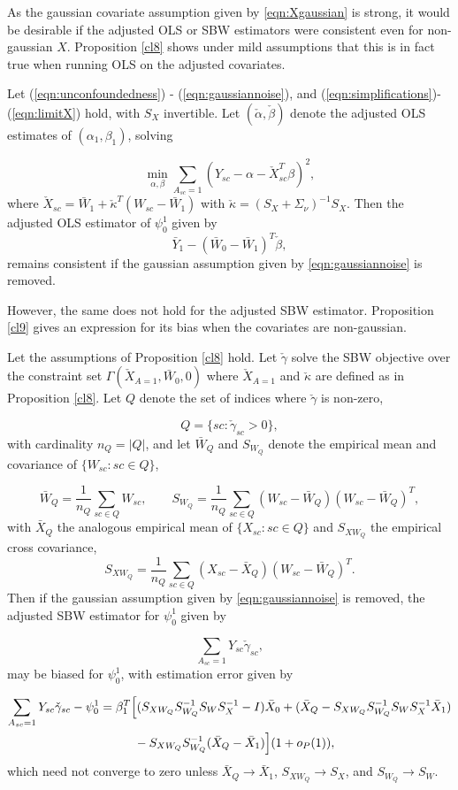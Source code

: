 As the gaussian covariate assumption given by \eqref{eqn:Xgaussian} is strong, it would be desirable if the adjusted OLS or SBW estimators were consistent even for non-gaussian $X$. Proposition \ref{cl8} shows under mild assumptions that this is in fact true when running OLS on the adjusted covariates. 

\begin{proposition}\label{cl8}
Let (\ref{eqn:unconfoundedness}) - (\ref{eqn:gaussiannoise}), and (\ref{eqn:simplifications})- (\ref{eqn:limitX}) hold, with $S_X$ invertible. Let $(\check{\alpha}, \check{\beta})$ denote the adjusted OLS estimates of $(\alpha_1, \beta_1)$, solving

\[ \min_{\alpha,\beta} \sum_{A_{sc}=1} (Y_{sc} - \alpha - \check{X}_{sc}^T \beta)^2, \]
where $\check{X}_{sc} = \bar{W}_1 + \check{\kappa}^T(W_{sc} - \bar{W}_1)$ with $\check{\kappa} = (S_X + \Sigma_\nu)^{-1}S_X$. Then the adjusted OLS estimator of $\psi_0^1$ given by
\[ \bar{Y}_1 - (\bar{W}_0 - \bar{W}_1)^T \check{\beta},\]
remains consistent if the gaussian assumption given by \eqref{eqn:gaussiannoise} is removed.
\end{proposition}

However, the same does not hold for the adjusted SBW estimator. Proposition \ref{cl9} gives an expression for its bias when the covariates are non-gaussian. 

\begin{proposition}\label{cl9}
Let the assumptions of Proposition \ref{cl8} hold. Let $\check{\gamma}$ solve the SBW objective over the constraint set $\Gamma(\check{X}_{A=1}, \bar{W}_0, 0)$ where $\check{X}_{A=1}$ and $\check{\kappa}$ are defined as in Proposition \ref{cl8}. Let $Q$ denote the set of indices where $\check{\gamma}$ is non-zero,

\[ Q = \{sc: \check{\gamma}_{sc} > 0\},\]
with cardinality $n_Q = |Q|$, and let $\bar{W}_Q$ and $S_{W_Q}$ denote the empirical mean and covariance of $\{W_{sc}:sc \in Q\}$,

\[ \bar{W}_Q = \frac{1}{n_Q}\sum_{sc \in Q} W_{sc},\qquad S_{W_Q} = \frac{1}{n_Q} \sum_{sc \in Q} (W_{sc} - \bar{W}_Q)(W_{sc} - \bar{W}_Q)^T,\]
with $\bar{X}_Q$ the analogous empirical mean of $\{X_{sc}:sc \in Q\}$ and $S_{XW_Q}$ the empirical cross covariance,
\[ S_{XW_Q} = \frac{1}{n_Q} \sum_{sc \in Q} (X_{sc} - \bar{X}_Q)(W_{sc} - \bar{W}_Q)^T.\]
Then if the gaussian assumption given by \eqref{eqn:gaussiannoise} is removed, the adjusted SBW estimator for $\psi_0^1$ given by 

\[\sum_{A_{sc}=1} Y_{sc} \check{\gamma}_{sc},\]
may be biased for $\psi_0^1$, with estimation error given by 

\begin{align} 
\nonumber \sum_{A_{sc}=1} Y_{sc} \check{\gamma}_{sc} - \psi_0^1 & = \beta_1^T\Big[(S_{XW_Q}S_{W_Q}^{-1}S_WS_X^{-1} - I)\bar{X}_0  + (\bar{X}_Q - S_{XW_Q}S_{W_Q}^{-1} S_W S_X^{-1} \bar{X}_1) \\
& \hskip1cm {} - S_{XW_Q}S_{W_Q}^{-1}(\bar{X}_Q - \bar{X}_1)\Big](1 + o_P(1)),  \label{eqn:cl9.error}
\end{align}
which need not converge to zero unless $\bar{X}_Q \to \bar{X}_1$, $S_{XW_Q} \to S_X$, and $S_{W_Q} \to S_W$.
\end{proposition}

